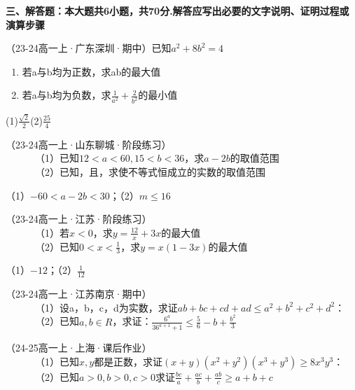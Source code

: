 \textbf{三、解答题：本大题共6小题，共70分.解答应写出必要的文字说明、证明过程或演算步骤}
\begin{hmwk}
    （23-24高一上·广东深圳·期中）已知$a^2+8b^2=4$
    \begin{enumerate}
        \item 若a与b均为正数，求ab的最大值
        \item 若a与b均为负数，求$\displaystyle \frac{1}{a^2}+\frac{2}{b^2}$的最小值
    \end{enumerate}
    \begin{jiexi}
        (1)$\displaystyle \frac{\sqrt{2}}{2}$\quad(2)$\displaystyle \frac{25}{4}$
    \end{jiexi}
\end{hmwk}

\begin{hmwk}
    （23-24高一上·山东聊城·阶段练习）\\
          （1）已知$12<a<60,15<b<36$，求$a-2b$的取值范围\\
          （2）已知，且，求使不等式恒成立的实数的取值范围
    \begin{jiexi}
        （1）$-60<a-2b<30$；（2）$m\le16$
    \end{jiexi}
\end{hmwk}

\begin{hmwk}
    （23-24高一上·江苏·阶段练习）\\
          （1）若$x<0$，求$\displaystyle y=\frac{12}{x}+3x$的最大值 \\
          （2）已知$\displaystyle 0<x<\frac{1}{3}$，求$y=x(1-3x)$的最大值
    \begin{jiexi}
        （1）$-12$；（2）$\frac{1}{12}$
    \end{jiexi}
\end{hmwk}

\begin{hmwk}
    （23-24高一上·江苏南京·期中）\\
          （1）设a，b，c，d为实数，求证$ab+bc+cd+ad \le a^2+b^2+c^2+d^2$： \\
          （2）已知$a,b\in R$，求证：$\displaystyle \frac{6^a}{36^{a+1}+1}\le \frac{5}{6}-b+\frac{b^2}{3}$
\end{hmwk}

\begin{hmwk}
    （24-25高一上·上海·课后作业）\\
          （1）已知$x,y$都是正数，求证$(x+y)(x^2+y^2)(x^3+y^3)\ge8x^3y^3$： \\
          （2）已知$a>0,b>0,c>0$求证$\displaystyle \frac{bc}{a}+\frac{ac}{b}+\frac{ab}{c}\ge a+b+c$
\end{hmwk}